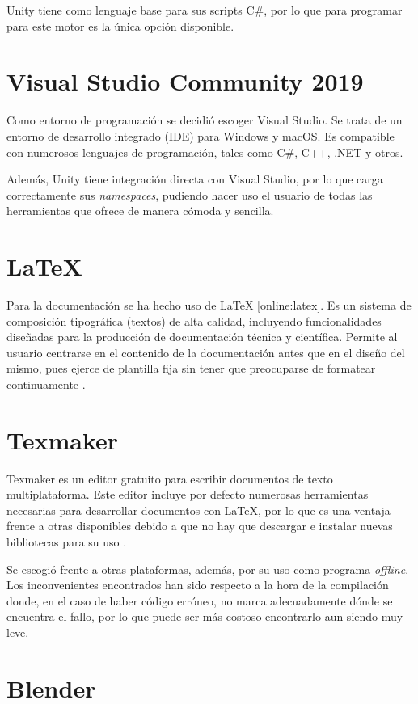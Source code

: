 Unity tiene como lenguaje base para sus scripts C\#, por lo que para programar para este motor es la única opción disponible.

\section{Visual Studio Community 2019}

Como entorno de programación se decidió escoger Visual Studio. Se trata de un entorno de desarrollo integrado (IDE) para Windows y macOS. Es compatible con numerosos lenguajes de programación, tales como C\#, C++, .NET y otros. 

Además, Unity tiene integración directa con Visual Studio, por lo que carga correctamente sus \textit{namespaces}, pudiendo hacer uso el usuario de todas las herramientas que ofrece de manera cómoda y sencilla.

\section{LaTeX}

Para la documentación se ha hecho uso de LaTeX [online:latex]. Es un sistema de composición tipográfica (textos) de alta calidad, incluyendo funcionalidades diseñadas para la producción de documentación técnica y científica. Permite al usuario centrarse en el contenido de la documentación antes que en el diseño del mismo, pues ejerce de plantilla fija sin tener que preocuparse de formatear continuamente \cite{latex}.

\section{Texmaker}

Texmaker es un editor gratuito para escribir documentos de texto multiplataforma. Este editor incluye por defecto numerosas herramientas necesarias para desarrollar documentos con LaTeX, por lo que es una ventaja frente a otras disponibles debido a que no hay que descargar e instalar nuevas bibliotecas para su uso \cite{texmaker}.

Se escogió frente a otras plataformas, además, por su uso como programa \textit{offline}. Los inconvenientes encontrados han sido respecto a la hora de la compilación donde, en el caso de haber código erróneo, no marca adecuadamente dónde se encuentra el fallo, por lo que puede ser más costoso encontrarlo aun siendo muy leve.

\section{Blender}


